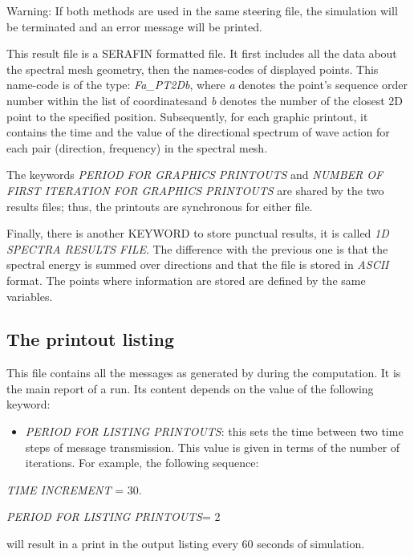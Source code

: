 \begin{WarningBlock}{Warning:}
  If both methods are used in the same steering file, the simulation will be terminated
  and an error message will be printed.
\end{WarningBlock}

This result file is a SERAFIN formatted file. It first includes all the data about the
spectral mesh geometry, then the names-codes of displayed points. This name-code is of
the type: \textit{Fa\_PT2Db}, where \textit{a} denotes the point's sequence order number
within the list of coordinatesand \textit{b} denotes the number of the closest 2D point
to the specified position. Subsequently, for each graphic printout, it contains the time
and the value of the directional spectrum of wave action for each pair (direction,
frequency) in the spectral mesh.

The keywords \textit{PERIOD FOR GRAPHICS PRINTOUTS }and \textit{NUMBER OF FIRST
  ITERATION FOR GRAPHICS PRINTOUTS}
are shared by the two results files; thus, the printouts are synchronous for either file.

Finally, there is another KEYWORD to store punctual results, it is called \textit{1D
  SPECTRA RESULTS FILE}. The difference with the previous one is that the spectral
energy is summed over directions and that the file is stored in \textit{ASCII} format.
The points where information are stored are defined by the same variables.


\subsection{ The printout listing}

This file contains all the messages as generated by \tomawac during the computation.
It is the main report of a \tomawac run. Its content depends on the value of the
following keyword:

\begin{itemize}
\item  \textit{PERIOD FOR LISTING PRINTOUTS}: this sets the time between two time steps
  of message transmission. This value is given in terms of the number of iterations.
  For example, the following sequence:
\end{itemize}

\textit{TIME INCREMENT} = 30.    

\textit{PERIOD FOR LISTING PRINTOUTS}= 2 

will result in a print in the output listing every 60 seconds of simulation.

